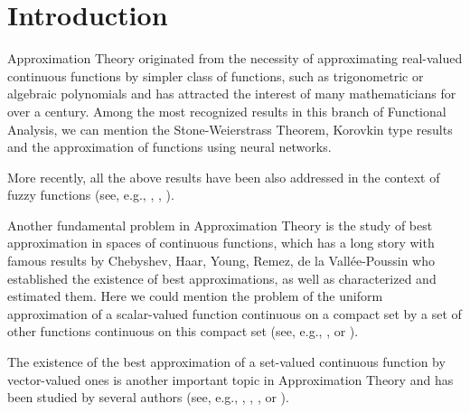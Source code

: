 \documentclass[12pt]{amsart}
\begin{document}






\newtheorem{theorem}{Theorem}[section]
\newtheorem{lemma}[theorem]{Lemma}
\newtheorem{proposition}[theorem]{Proposition}
\newtheorem{corollary}[theorem]{Corollary}
\newtheorem{question}[theorem]{Question}

\theoremstyle{definition}
\newtheorem{definition}[theorem]{Definition}
\newtheorem{algorithm}[theorem]{Algorithm}
\newtheorem{conclusion}[theorem]{Conclusion}
\newtheorem{problem}[theorem]{Problem}

\theoremstyle{remark}
\newtheorem{remark}[theorem]{Remark}


\section{Introduction}



Approximation Theory originated from the necessity of approximating real-valued continuous
functions by simpler class of functions, such as trigonometric or algebraic polynomials and has attracted
the interest of many mathematicians for over a century. Among the most recognized results in this branch of Functional Analysis, we can mention the Stone-Weierstrass Theorem, Korovkin type results and the approximation of functions using neural networks.

More recently, all the above results have been also addressed in the context of fuzzy functions (see, e.g., \cite{anas}, \cite{huangwu}, \cite{FSS17}).

Another fundamental problem in Approximation Theory
is the study of best approximation in spaces of continuous functions, which has a long story with famous results by Chebyshev, Haar, Young, Remez, de la Vallée-Poussin who established the existence of best approximations, as well as characterized and estimated them. Here we could mention the problem of the uniform approximation of a scalar-valued
function continuous on a compact set by a set of other functions continuous on this compact set (see, e.g., \cite{prolacamb}, \cite{prola} or \cite{chen}).

The existence of the best approximation of a set-valued continuous function by vector-valued ones is another important topic in Approximation Theory and has been studied by several authors (see, e.g., \cite{Olech}, \cite{prolamachado}, \cite{lau}, \cite{cuenya} or \cite{kashi}).
\end{document}
